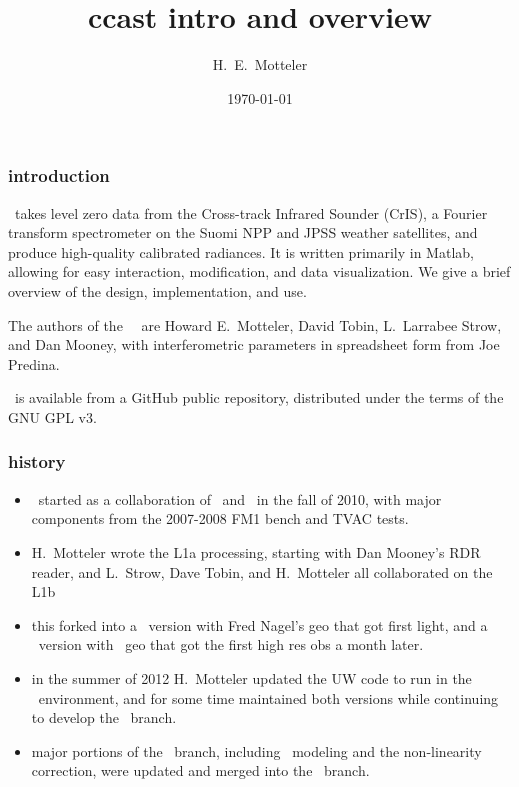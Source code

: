 \documentclass[11pt]{beamer}
\title{ccast intro and overview}
\author{H.~E.~Motteler}
\institute{
  UMBC Atmospheric Spectroscopy Lab \\
  Joint Center for Earth Systems Technology \\
}
\date{\today}
\begin{document}
\begin{frame}[plain]
\titlepage
\end{frame}
\begin{frame}
\frametitle{introduction}

\ccast\ takes level zero data from the Cross-track Infrared Sounder
(CrIS), a Fourier transform spectrometer on the Suomi NPP and JPSS
weather satellites, and produce high-quality calibrated radiances.
It is written primarily in Matlab, allowing for easy interaction,
modification, and data visualization.  We give a brief overview of
the design, implementation, and use.

\hspace{2cm}

The authors of the \umbc\ \ccast\ are Howard E.~Motteler, David Tobin,
L.~Larrabee Strow, and Dan Mooney, with interferometric parameters
in spreadsheet form from Joe Predina.

\hspace{2cm}

\ccast\ is available from a GitHub public repository, distributed
under the terms of the GNU GPL v3.

\end{frame}
\begin{frame}
\frametitle{history}

\begin{itemize}
  \item \ccast\ started as a collaboration of \umbc\ and \uw\ in the
    fall of 2010, with major components from the 2007-2008 FM1 bench
    and TVAC tests.

  \item H.~Motteler wrote the L1a processing, starting with Dan
    Mooney's RDR reader, and L.~Strow, Dave Tobin, and H.~Motteler
    all collaborated on the L1b 

  \item this forked into a \uw\ version with Fred Nagel's geo that
    got first light, and a \umbc\ version with \noaa\ geo that got
    the first high res obs a month later.

  \item in the summer of 2012 H.~Motteler updated the UW code to 
    run in the \umbc\ environment, and for some time maintained both
    versions while continuing to develop the \umbc\ branch.

  \item major portions of the \uw\ branch, including \ict\ modeling
    and the non-linearity correction, were updated and merged into
    the \umbc\ branch.
\end{itemize}


\end{frame}
\end{document}
